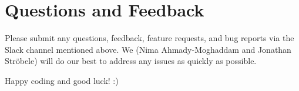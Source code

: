 \documentclass[
    a4paper,
    english,
    DIV=16,
    11pt,
    parskip=half,
]{scrartcl}
\begin{document}
\section*{Questions and Feedback}
Please submit any questions, feedback, feature requests, and bug reports via the Slack channel mentioned above. We (Nima Ahmady-Moghaddam and Jonathan Ströbele) will do our best to address any issues as quickly as possible. \par Happy coding and good luck! :)

\end{document}
